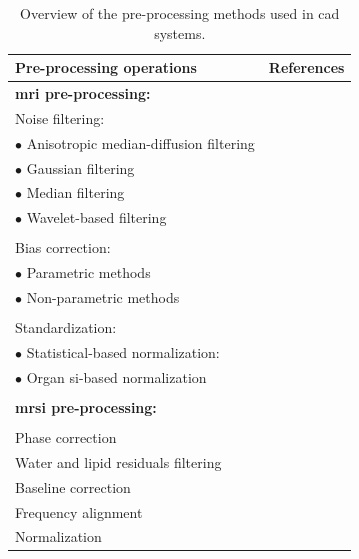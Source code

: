 \begin{table}
  \caption{Overview of the pre-processing methods used in \acs*{cad} systems.}
  \scriptsize
  \centering
  \begin{tabular}{l r}
    \toprule
    \textbf{Pre-processing operations} & \textbf{References} \\
    \midrule
    \textbf{\ac{mri} pre-processing:} & \\
    \quad Noise filtering: &  \\
    \quad \quad $\bullet$ Anisotropic median-diffusion filtering & \cite{rampun2015classifying,rampun2015computer,rampun2016computer,rampun2016computerb,rampun2016quantitative}  \\
    \quad \quad $\bullet$ Gaussian filtering & \cite{samarasinghe2016semi}  \\
    \quad \quad $\bullet$ Median filtering & \cite{Ozer2009,Ozer2010}  \\
    \quad \quad $\bullet$ Wavelet-based filtering & \cite{Ampeliotis2007,Ampeliotis2008,Lopes2011} \\ \\ [-1.5ex]
    \quad Bias correction: & \\
    \quad \quad $\bullet$ Parametric methods & \cite{Lv2009,Viswanath2009,giannini2015fully} \\
    \quad \quad $\bullet$ Non-parametric methods & \cite{Viswanath2011} \\ \\ [-1.5ex]
    \quad Standardization: & \\
    \quad \quad $\bullet$ Statistical-based normalization: & \cite{Artan2009,Artan2010,Lv2009,Ozer2009,Ozer2010,rampun2015classifying,rampun2015computer,rampun2016computer,rampun2016computerb,rampun2016quantitative,Viswanath2009,Viswanath2011,Viswanath2012} \\
    \quad \quad $\bullet$ Organ \ac{si}-based normalization & \cite{Niaf2011,Niaf2012,lehaire2014computer,samarasinghe2016semi} \\ \\ [-1.5ex]
    \textbf{\ac{mrsi} pre-processing:} & \\ \\ [-1.5ex]
    \quad Phase correction & \cite{Parfait2012,trigui2016classification,trigui2017automatic} \\
    \quad Water and lipid residuals filtering & \cite{Kelm2007} \\
    \quad Baseline correction & \cite{Parfait2012,Tiwari2012,trigui2016classification,trigui2017automatic} \\
    \quad Frequency alignment & \cite{Tiwari2012,trigui2016classification,trigui2017automatic} \\
    \quad Normalization & \cite{Parfait2012,trigui2016classification,trigui2017automatic} \\
    \bottomrule
  \end{tabular}
\label{tab:summary-preproc}
\end{table}
